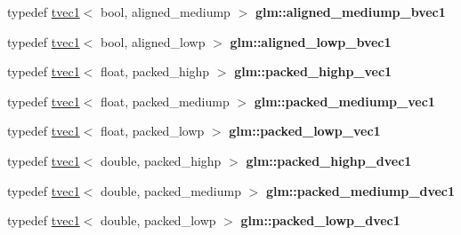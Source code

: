 \begin{DoxyCompactItemize}
\item 
\mbox{\label{group__gtc__type__aligned_gaaafb3137651696c59dd359c891338dff}} 
typedef \hyperlink{structglm_1_1tvec1}{tvec1}$<$ bool, aligned\+\_\+mediump $>$ {\bfseries glm\+::aligned\+\_\+mediump\+\_\+bvec1}
\item 
\mbox{\label{group__gtc__type__aligned_ga14a75d34e21dea21ebc963dbb7596a02}} 
typedef \hyperlink{structglm_1_1tvec1}{tvec1}$<$ bool, aligned\+\_\+lowp $>$ {\bfseries glm\+::aligned\+\_\+lowp\+\_\+bvec1}
\item 
\mbox{\label{group__gtc__type__aligned_ga8514bab94f23d24c7655949bb44797a6}} 
typedef \hyperlink{structglm_1_1tvec1}{tvec1}$<$ float, packed\+\_\+highp $>$ {\bfseries glm\+::packed\+\_\+highp\+\_\+vec1}
\item 
\mbox{\label{group__gtc__type__aligned_ga8925347b8c400ad16e18e6e46110002a}} 
typedef \hyperlink{structglm_1_1tvec1}{tvec1}$<$ float, packed\+\_\+mediump $>$ {\bfseries glm\+::packed\+\_\+mediump\+\_\+vec1}
\item 
\mbox{\label{group__gtc__type__aligned_gaabe6eb85a9090961e1f8fc809dabc0e9}} 
typedef \hyperlink{structglm_1_1tvec1}{tvec1}$<$ float, packed\+\_\+lowp $>$ {\bfseries glm\+::packed\+\_\+lowp\+\_\+vec1}
\item 
\mbox{\label{group__gtc__type__aligned_ga7aa42808654e047d026b0c066870a578}} 
typedef \hyperlink{structglm_1_1tvec1}{tvec1}$<$ double, packed\+\_\+highp $>$ {\bfseries glm\+::packed\+\_\+highp\+\_\+dvec1}
\item 
\mbox{\label{group__gtc__type__aligned_ga225f491d0c00d40832957ed3fd431315}} 
typedef \hyperlink{structglm_1_1tvec1}{tvec1}$<$ double, packed\+\_\+mediump $>$ {\bfseries glm\+::packed\+\_\+mediump\+\_\+dvec1}
\item 
\mbox{\label{group__gtc__type__aligned_ga6c11aa5a23fdd73f1981d306b3369f3f}} 
typedef \hyperlink{structglm_1_1tvec1}{tvec1}$<$ double, packed\+\_\+lowp $>$ {\bfseries glm\+::packed\+\_\+lowp\+\_\+dvec1}

\end{DoxyCompactItemize}

